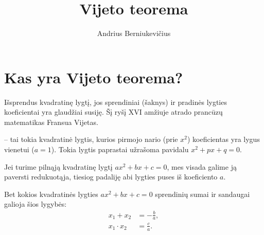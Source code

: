 \documentclass[11pt,a4paper]{scrartcl}
\title{Vijeto teorema}
\author{Andrius Berniukevičius}
\begin{document}
\maketitle

\section{Kas yra Vijeto teorema?}

Išsprendus kvadratinę lygtį, jos sprendiniai (šaknys) ir pradinės lygties koeficientai yra glaudžiai susiję. Šį ryšį XVI amžiuje atrado prancūzų matematikas Fransua Vijetas. 

\begin{definition}
 -- tai tokia kvadratinė lygtis, kurios pirmojo nario (prie $x^2$) koeficientas yra lygus vienetui ($a=1$). Tokia lygtis paprastai užrašoma pavidalu $x^2 + px + q = 0$.
\end{definition}

Jei turime pilnąją kvadratinę lygtį $ax^2 + bx + c = 0$, mes visada galime ją paversti redukuotąja, tiesiog padaliję abi lygties puses iš koeficiento $a$.

\begin{theorem}
Bet kokios kvadratinės lygties $ax^2 + bx + c = 0$ sprendinių sumai ir sandaugai galioja šios lygybės:
\[
\begin{aligned}
x_1 + x_2 &= -\frac{b}{a}, \\
x_1 \cdot x_2 &= \frac{c}{a}.
\end{aligned}
\]
\end{theorem}
\end{document}
